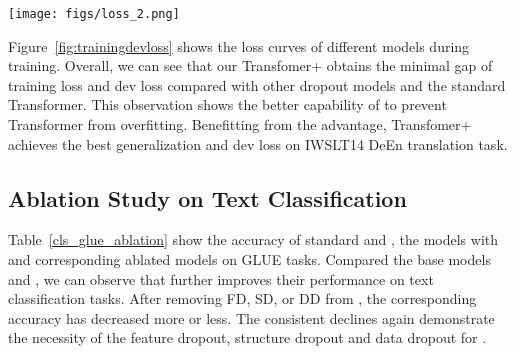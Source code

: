 \documentclass[11pt]{article}
\begin{document}
\begin{figure*}[!tbp]
\centering
\texttt{[image: figs/loss\_2.png]}
\caption{The training and dev loss of different models on IWSLT14 DeEn translation task.}
\label{fig:trainingdevloss}
\end{figure*}

Figure~\ref{fig:trainingdevloss} shows the loss curves of different models during training. Overall, we can see that our Transfomer+ obtains the minimal gap of training loss and dev loss compared with other dropout models and the standard Transformer. This observation shows the better capability of  to prevent Transformer from overfitting. Benefitting from the advantage, Transfomer+ achieves the best generalization and dev loss on IWSLT14 DeEn translation task.


\subsection{Ablation Study on Text Classification}
\label{sec:appendix_ablationstudy}

Table~\ref{cls_glue_ablation} show the accuracy of standard  and , the models with  and corresponding ablated models on GLUE tasks. Compared the base models  and , we can observe that  further improves their performance on text classification tasks. After removing FD, SD, or DD from , the corresponding accuracy has decreased more or less. The consistent declines again demonstrate the necessity of the feature dropout, structure dropout and data dropout for .
\end{document}
